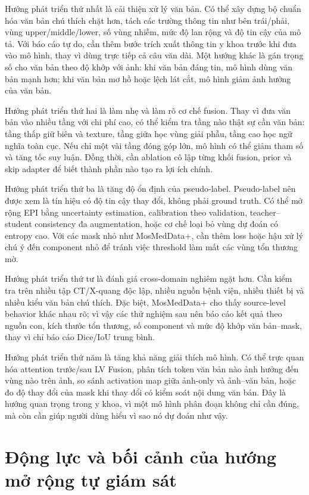 Hướng phát triển thứ nhất là cải thiện xử lý văn bản. Có thể xây dựng bộ chuẩn hóa văn bản chú thích chặt hơn, tách các trường thông tin như bên trái/phải, vùng upper/middle/lower, số vùng nhiễm, mức độ lan rộng và độ tin cậy của mô tả. Với báo cáo tự do, cần thêm bước trích xuất thông tin y khoa trước khi đưa vào mô hình, thay vì dùng trực tiếp cả câu văn dài. Một hướng khác là gán trọng số cho văn bản theo độ khớp với ảnh: khi văn bản đáng tin, mô hình dùng văn bản mạnh hơn; khi văn bản mơ hồ hoặc lệch lát cắt, mô hình giảm ảnh hưởng của văn bản.

Hướng phát triển thứ hai là làm nhẹ và làm rõ cơ chế fusion. Thay vì đưa văn bản vào nhiều tầng với chi phí cao, có thể kiểm tra tầng nào thật sự cần văn bản: tầng thấp giữ biên và texture, tầng giữa học vùng giải phẫu, tầng cao học ngữ nghĩa toàn cục. Nếu chỉ một vài tầng đóng góp lớn, mô hình có thể giảm tham số và tăng tốc suy luận. Đồng thời, cần ablation cô lập từng khối fusion, prior và skip adapter để biết thành phần nào tạo ra lợi ích chính.

Hướng phát triển thứ ba là tăng độ ổn định của pseudo-label. Pseudo-label nên được xem là tín hiệu có độ tin cậy thay đổi, không phải ground truth. Có thể mở rộng EPI bằng uncertainty estimation, calibration theo validation, teacher--student consistency đa augmentation, hoặc cơ chế loại bỏ vùng dự đoán có entropy cao. Với các mask nhỏ như MosMedData+, cần thêm loss hoặc hậu xử lý chú ý đến component nhỏ để tránh việc threshold làm mất các vùng tổn thương mờ.

Hướng phát triển thứ tư là đánh giá cross-domain nghiêm ngặt hơn. Cần kiểm tra trên nhiều tập CT/X-quang độc lập, nhiều nguồn bệnh viện, nhiều thiết bị và nhiều kiểu văn bản chú thích. Đặc biệt, MosMedData+ cho thấy source-level behavior khác nhau rõ; vì vậy các thử nghiệm sau nên báo cáo kết quả theo nguồn con, kích thước tổn thương, số component và mức độ khớp văn bản--mask, thay vì chỉ báo cáo Dice/IoU trung bình.

Hướng phát triển thứ năm là tăng khả năng giải thích mô hình. Có thể trực quan hóa attention trước/sau LV Fusion, phân tích token văn bản nào ảnh hưởng đến vùng nào trên ảnh, so sánh activation map giữa ảnh-only và ảnh--văn bản, hoặc đo độ thay đổi của mask khi thay đổi có kiểm soát nội dung văn bản. Đây là hướng quan trọng trong y khoa, vì một mô hình phân đoạn không chỉ cần đúng, mà còn cần giúp người dùng hiểu vì sao nó dự đoán như vậy.

\section{Động lực và bối cảnh của hướng mở rộng tự giám sát}

